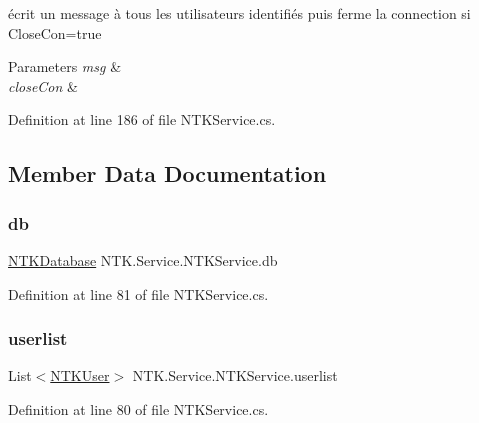 écrit un message à tous les utilisateurs identifiés puis ferme la connection si Close\+Con=true 


\begin{DoxyParams}{Parameters}
{\em msg} & \\
\hline
{\em close\+Con} & \\
\hline
\end{DoxyParams}


Definition at line 186 of file N\+T\+K\+Service.\+cs.



\subsection{Member Data Documentation}
\mbox{\label{class_n_t_k_1_1_service_1_1_n_t_k_service_a68903e0a461b9bb373db39304e3ad9be}} 
\subsubsection{\texorpdfstring{db}{db}}
{\footnotesize\ttfamily \mbox{\hyperlink{class_n_t_k_1_1_database_1_1_n_t_k_database}{N\+T\+K\+Database}} N\+T\+K.\+Service.\+N\+T\+K\+Service.\+db\hspace{0.3cm}{\ttfamily [protected]}}



Definition at line 81 of file N\+T\+K\+Service.\+cs.

\mbox{\label{class_n_t_k_1_1_service_1_1_n_t_k_service_a14977c798a805fea99802fa40da31aa0}} 
\subsubsection{\texorpdfstring{userlist}{userlist}}
{\footnotesize\ttfamily List$<$\mbox{\hyperlink{class_n_t_k_1_1_n_t_k_user}{N\+T\+K\+User}}$>$ N\+T\+K.\+Service.\+N\+T\+K\+Service.\+userlist\hspace{0.3cm}{\ttfamily [protected]}}



Definition at line 80 of file N\+T\+K\+Service.\+cs.



